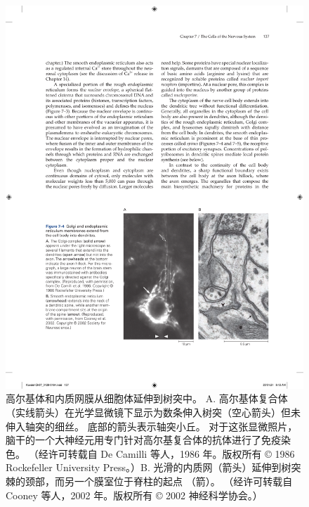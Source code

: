 \begin{figure}[htbp]
	\centering
	\includegraphics[width=0.7\linewidth]{chap07/fig_7_4}
	\caption{高尔基体和内质网膜从细胞体延伸到树突中。 A. 高尔基体复合体（实线箭头）在光学显微镜下显示为数条伸入树突（空心箭头）但未伸入轴突的细丝。 底部的箭头表示轴突小丘。 对于这张显微照片，脑干的一个大神经元用专门针对高尔基复合体的抗体进行了免疫染色。 （经许可转载自 De Camilli 等人，1986 年。版权所有 © 1986 Rockefeller University Press。）B. 光滑的内质网（箭头）延伸到树突棘的颈部，而另一个膜室位于脊柱的起点 （箭）。 （经许可转载自 Cooney 等人，2002 年。版权所有 © 2002 神经科学协会。）}
	\label{fig:7_4}
\end{figure}

